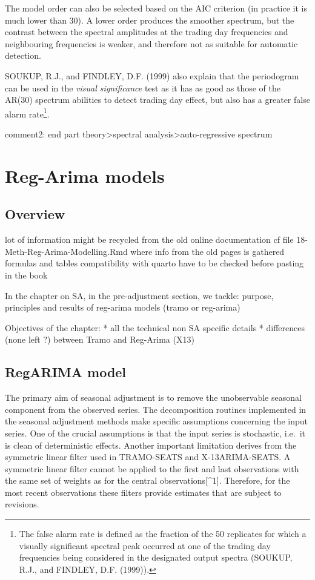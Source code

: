 \documentclass[
  letterpaper,
  DIV=11,
  numbers=noendperiod]{scrreprt}
\begin{document}
The model order can also be selected based on the AIC criterion (in
practice it is much lower than 30). A lower order produces the smoother
spectrum, but the contrast between the spectral amplitudes at the
trading day frequencies and neighbouring frequencies is weaker, and
therefore not as suitable for automatic detection.

SOUKUP, R.J., and FINDLEY, D.F. (1999) also explain that the periodogram
can be used in the \emph{visual significance} test as it has as good as
those of the AR(30) spectrum abilities to detect trading day effect, but
also has a greater false alarm rate\footnote{The false alarm rate is
  defined as the fraction of the 50 replicates for which a visually
  significant spectral peak occurred at one of the trading day
  frequencies being considered in the designated output spectra (SOUKUP,
  R.J., and FINDLEY, D.F. (1999)).}.

comment2: end part theory\textgreater spectral
analysis\textgreater auto-regressive spectrum

\hypertarget{reg-arima-models}{%
\chapter{Reg-Arima models}\label{reg-arima-models}}

\hypertarget{overview-1}{%
\section{Overview}\label{overview-1}}

lot of information might be recycled from the old online documentation
cf file 18-Meth-Reg-Arima-Modelling.Rmd where info from the old pages is
gathered formulas and tables compatibility with quarto have to be
checked before pasting in the book

In the chapter on SA, in the pre-adjustment section, we tackle: purpose,
principles and results of reg-arima models (tramo or reg-arima)

Objectives of the chapter: * all the technical non SA specific details *
differences (none left ?) between Tramo and Reg-Arima (X13)

\hypertarget{regarima-model}{%
\section{RegARIMA model}\label{regarima-model}}

The primary aim of seasonal adjustment is to remove the unobservable
seasonal component from the observed series. The decomposition routines
implemented in the seasonal adjustment methods make specific assumptions
concerning the input series. One of the crucial assumptions is that the
input series is stochastic, i.e.~it is clean of deterministic effects.
Another important limitation derives from the symmetric linear filter
used in TRAMO-SEATS and X-13ARIMA-SEATS. A symmetric linear filter
cannot be applied to the first and last observations with the same set
of weights as for the central observations{[}\^{}1{]}. Therefore, for
the most recent observations these filters provide estimates that are
subject to revisions.
\end{document}
